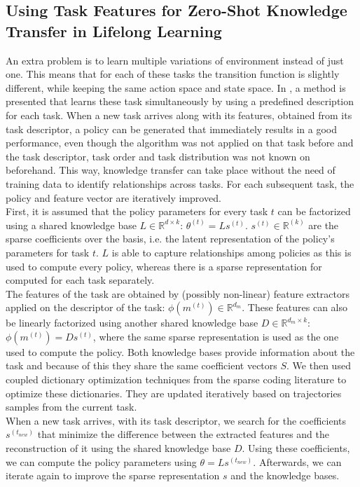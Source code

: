 \subsection{Using Task Features for Zero-Shot Knowledge Transfer in Lifelong Learning}
An extra problem is to learn multiple variations of environment instead of just one. This means that for each of these tasks the transition function is slightly different, while keeping the same action space and state space.
In \cite{Isele2016UsingLearning}, a method is presented that learns these task simultaneously by using a predefined description for each task.
When a new task arrives along with its features, obtained from its task descriptor, a policy can be generated that immediately results in a good performance, even though the algorithm was not applied on that task before and the task descriptor, task order and task distribution was not known on beforehand.
This way, knowledge transfer can take place without the need of training data to identify relationships across tasks. For each subsequent task, the policy and feature vector are iteratively improved.\\
First, it is assumed that the policy parameters for every task $t$ can be factorized using a shared knowledge base $L \in \mathbb{R}^{d \times k}$: $\theta^{(t)} = Ls^{(t)}$. $s^{(t)} \in \mathbb{R}^{(k)}$ are the sparse coefficients over the basis, i.e. the latent representation of the policy's parameters for task $t$. $L$ is able to capture relationships among policies as this is used to compute every policy, whereas there is a sparse representation for computed for each task separately.\\
The features of the task are obtained by (possibly non-linear) feature extractors applied on the descriptor of the task: $\phi(m^{(t)}) \in \mathbb{R}^{d_m}$. These features can also be linearly factorized using another shared knowledge base $D \in \mathbb{R}^{d_m \times k}$: $\phi(m^{(t)}) = Ds^{(t)}$, where the same sparse representation is used as the one used to compute the policy. Both knowledge bases provide information about the task and because of this they share the same coefficient vectors $S$.
We then used coupled dictionary optimization techniques from the sparse coding literature to optimize these dictionaries. They are updated iteratively based on trajectories samples from the current task.\\
When a new task arrives, with its task descriptor, we search for the coefficients $s^{(t_{new})}$ that minimize the difference between the extracted features and the reconstruction of it using the shared knowledge base $D$. Using these coefficients, we can compute the policy parameters using $\theta = Ls^{(t_{new})}$. Afterwards, we can iterate again to improve the sparse representation $s$ and the knowledge bases.
